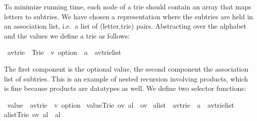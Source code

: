 %
\begin{isabellebody}%
\def\isabellecontext{Trie}%
%
\isadelimtheory
%
\endisadelimtheory
%
\isatagtheory
%
\endisatagtheory
{\isafoldtheory}%
%
\isadelimtheory
%
\endisadelimtheory
%
\begin{isamarkuptext}%
To minimize running time, each node of a trie should contain an array that maps
letters to subtries. We have chosen a
representation where the subtries are held in an association list, i.e.\ a
list of (letter,trie) pairs.  Abstracting over the alphabet  and the
values  we define a trie as follows:%
\end{isamarkuptext}%
\isamarkuptrue%
\isamarkupfalse%
\ {\isacharparenleft}{\isacharprime}a{\isacharcomma}{\isacharprime}v{\isacharparenright}trie\ {\isacharequal}\ Trie\ \ {\isachardoublequoteopen}{\isacharprime}v\ option{\isachardoublequoteclose}\ \ {\isachardoublequoteopen}{\isacharparenleft}{\isacharprime}a\ {\isacharasterisk}\ {\isacharparenleft}{\isacharprime}a{\isacharcomma}{\isacharprime}v{\isacharparenright}trie{\isacharparenright}list{\isachardoublequoteclose}%
\begin{isamarkuptext}%
\noindent
{}%
The first component is the optional value, the second component the
association list of subtries.  This is an example of nested recursion involving products,
which is fine because products are datatypes as well.
We define two selector functions:%
\end{isamarkuptext}%
\isamarkuptrue%
\isamarkupfalse%
\ {\isachardoublequoteopen}value{\isachardoublequoteclose}\ {\isacharcolon}{\isacharcolon}\ {\isachardoublequoteopen}{\isacharparenleft}{\isacharprime}a{\isacharcomma}{\isacharprime}v{\isacharparenright}trie\ {\isasymRightarrow}\ {\isacharprime}v\ option{\isachardoublequoteclose}\ \isanewline
{\isachardoublequoteopen}value{\isacharparenleft}Trie\ ov\ al{\isacharparenright}\ {\isacharequal}\ ov{\isachardoublequoteclose}\isanewline
{}\isamarkupfalse%
\ alist\ {\isacharcolon}{\isacharcolon}\ {\isachardoublequoteopen}{\isacharparenleft}{\isacharprime}a{\isacharcomma}{\isacharprime}v{\isacharparenright}trie\ {\isasymRightarrow}\ {\isacharparenleft}{\isacharprime}a\ {\isacharasterisk}\ {\isacharparenleft}{\isacharprime}a{\isacharcomma}{\isacharprime}v{\isacharparenright}trie{\isacharparenright}list{\isachardoublequoteclose}\ \isanewline
{\isachardoublequoteopen}alist{\isacharparenleft}Trie\ ov\ al{\isacharparenright}\ {\isacharequal}\ al{\isachardoublequoteclose}%

\end{isabellebody}
